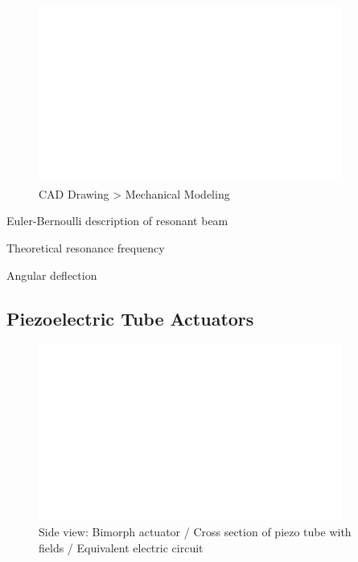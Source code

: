 \begin{figure}[h!]
      \centering
      \includegraphics[width=10cm,draft]{figures/foo.png}
      \caption{CAD Drawing > Mechanical Modeling}
\end{figure}
Euler-Bernoulli description of resonant beam

Theoretical resonance frequency 

Angular deflection


\subsection{Piezoelectric Tube Actuators}



\begin{figure}[h!]
      \centering
      \includegraphics[width=10cm,draft]{figures/foo.png}
      \caption{Side view: Bimorph actuator / Cross section of piezo tube with fields / Equivalent electric circuit}
\end{figure}